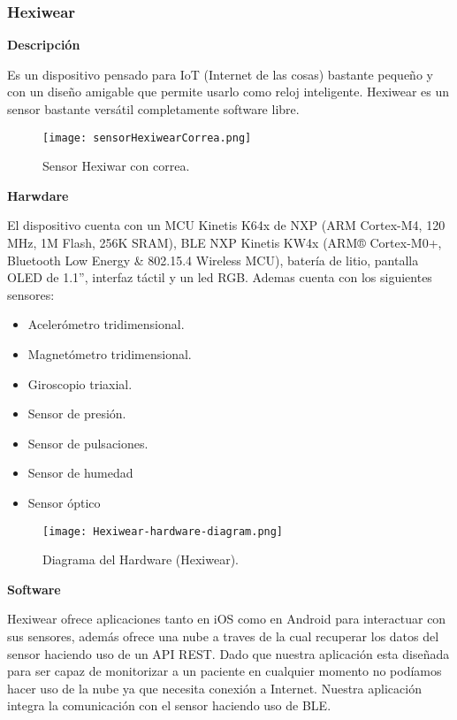 \documentclass[11pt,spanish]{article}
\begin{document}
\subsubsection{Hexiwear}
{\bf Descripción}
\newline

Es un dispositivo pensado para IoT (Internet de las cosas) bastante pequeño y con un diseño amigable que permite usarlo como reloj inteligente. Hexiwear es un sensor bastante versátil completamente software libre.
\newline

\begin{figure}
  \centering
  \texttt{[image: sensorHexiwearCorrea.png]}
  \caption{Sensor Hexiwar con correa.}
\end{figure}

{\bf Harwdare}
\newline

El dispositivo cuenta con un MCU Kinetis K64x de NXP (ARM Cortex-M4, 120 MHz, 1M Flash, 256K SRAM), BLE NXP Kinetis KW4x (ARM® Cortex-M0+, Bluetooth Low Energy \& 802.15.4 Wireless MCU), batería de litio, pantalla OLED
de 1.1'', interfaz táctil y un led RGB. Ademas cuenta con los siguientes sensores:

\begin{itemize}
  \item Acelerómetro tridimensional.
  \item Magnetómetro tridimensional.
  \item Giroscopio triaxial.
  \item Sensor de presión.
  \item Sensor de pulsaciones.
  \item Sensor de humedad
  \item Sensor óptico
\end{itemize}

\begin{figure}[H]
  \centering
  \texttt{[image: Hexiwear-hardware-diagram.png]}
  \caption{Diagrama del Hardware (Hexiwear).}
\end{figure}

{\bf Software}
\newline

Hexiwear ofrece aplicaciones tanto en iOS como en Android para interactuar con sus sensores, además ofrece una nube a traves de la cual recuperar los datos del sensor haciendo uso de un API REST. Dado que nuestra aplicación esta diseñada para ser capaz de monitorizar a un paciente en cualquier momento no podíamos hacer uso de la nube ya que necesita conexión a Internet. Nuestra aplicación integra la comunicación con el sensor haciendo uso de BLE.
\newline
\end{document}
